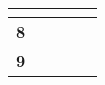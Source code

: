 \documentclass[12pt,a4paper,twoside]{article}
\begin{document}
\begin{longtable}{|>{\centering\arraybackslash}m{10cm}|>{\centering\arraybackslash}m{1.5cm}|>{\centering\arraybackslash}m{1.5cm}|>{\centering\arraybackslash}m{1.5cm}|>{\centering\arraybackslash}m{1.5cm}|}
                        
                    
                        
                            

                            
                                 & \textbf{}
                            

                        
                    
                    \\ \hline
                
                    \cellcolor{gray!20} \textbf{ 8 }
                     
                        
                            

                            
                                 & \textbf{}
                            

                        
                    
                        
                            

                            
                                 & \textbf{}
                            

                        
                    
                        
                            

                            
                                 & \textbf{}
                            

                        
                    
                        
                            & \cellcolor{gray!20} \textbf{}
                        
                    
                    \\ \hline
                
                    \cellcolor{gray!20} \textbf{ 9 }
                     
                        
                            

                            
                                 & \textbf{}
                            

                        
                    

\end{longtable}
\end{document}
